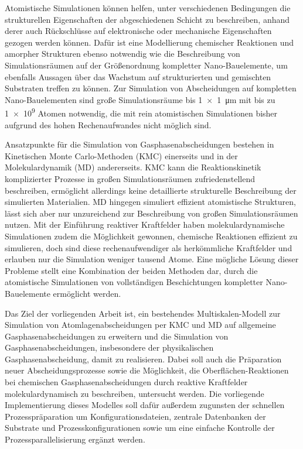 Atomistische Simulationen können helfen, unter verschiedenen Bedingungen die strukturellen Eigenschaften der abgeschiedenen Schicht zu beschreiben, anhand derer auch Rückschlüsse auf elektronische\cite{aspnes_optical_1982,steudel_influence_2004} oder mechanische Eigenschaften\cite{chasiotis_mechanical_2003,cammarata_nanoindentation_1990} gezogen werden können.
Dafür ist eine Modellierung chemischer Reaktionen und amorpher Strukturen ebenso notwendig wie die Beschreibung von Simulationsräumen auf der Größenordnung kompletter Nano-Bauelemente, um ebenfalls Aussagen über das Wachstum auf strukturierten und gemischten Substraten treffen zu können.
Zur Simulation von Abscheidungen auf kompletten Nano-Bauelementen sind große Simulationsräume bis \SI{1x1}{\micro\meter} mit bis zu \num{1e9} Atomen notwendig, die mit rein atomistischen Simulationen bisher aufgrund des hohen Rechenaufwandes nicht möglich sind\cite{plimpton_computational_1995}.

Ansatzpunkte für die Simulation von Gasphasenabscheidungen bestehen in Kinetischen Monte Carlo-Methoden (KMC)\cite{voter_introduction_2007} einerseits und in der Molekulardynamik (MD)\cite{hoover_molecular_1986} andererseits.
KMC kann die Reaktionskinetik komplizierter Prozesse in großen Simulationsräumen zufriedenstellend beschreiben, ermöglicht allerdings keine detaillierte strukturelle Beschreibung der simulierten Materialien.
MD hingegen simuliert effizient atomistische Strukturen, lässt sich aber nur unzureichend zur Beschreibung von großen Simulationsräumen nutzen.
Mit der Einführung reaktiver Kraftfelder haben molekulardynamische Simulationen zudem die Möglichkeit gewonnen, chemische Reaktionen effizient zu simulieren, doch sind diese rechenaufwendiger als herkömmliche Kraftfelder und erlauben nur die Simulation weniger tausend Atome\cite{van_duin_reaxff:_2001}.
Eine mögliche Lösung dieser Probleme stellt eine Kombination der beiden Methoden dar, durch die atomistische Simulationen von vollständigen Beschichtungen kompletter Nano-Bauelemente ermöglicht werden.


Das Ziel der vorliegenden Arbeit ist, ein bestehendes Multiskalen-Modell zur Simulation von Atomlagenabscheidungen per KMC und MD auf allgemeine Gasphasenabscheidungen zu erweitern und die Simulation von Gasphasenabscheidungen, insbesondere der physikalischen Gasphasenabscheidung, damit zu realisieren.
Dabei soll auch die Präparation neuer Abscheidungsprozesse sowie die Möglichkeit, die Oberflächen-Reaktionen bei chemischen Gasphasenabscheidungen durch reaktive Kraftfelder molekulardynamisch zu beschreiben, untersucht werden.
Die vorliegende Implementierung dieses Modelles soll dafür außerdem zugunsten der schnellen Prozesspräparation um Konfigurationsdateien, zentrale Datenbanken der Substrate und Prozesskonfigurationen sowie um eine einfache Kontrolle der Prozessparallelisierung ergänzt werden.

